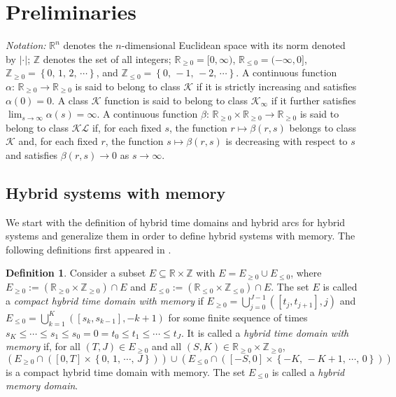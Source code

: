\documentclass[journal,final,twocolumn]{IEEEtran}
\theoremstyle{definition}
\newtheorem{defn}{Definition}
\begin{document}
\section{Preliminaries}\label{sec:pre}

\emph{Notation:} ${\mathbb R}^n$ denotes the $n$-dimensional Euclidean space with its norm denoted by  ${\left\vert{\cdot}\right\vert}$; $\mathbb{Z}$ denotes the set of all integers; ${\mathbb R}_{\ge 0}= [0,\infty)$, ${\mathbb R}_{\le 0}=(-\infty,0]$, ${\mathbb{Z}}_{\ge 0}={\left\{{0,\,1,\,2,\,\cdots}\right\}}$, and ${\mathbb{Z}}_{\le 0}={\left\{{0,\,-1,\,-2,\,\cdots}\right\}}$. A continuous function $\alpha:\,{\mathbb R}_{\ge 0} \rightarrow {\mathbb R}_{\ge 0}$ is said to belong to class $\mathcal{K}$ if it is strictly increasing and satisfies $\alpha(0) = 0$. A class $\mathcal{K}$ function is said to belong to class $\mathcal{K}_{\infty}$ if it further satisfies $\lim_{s \rightarrow \infty} \alpha(s) = \infty$. A continuous function $\beta:\,{\mathbb R}_{\ge 0}\times{\mathbb R}_{\ge 0} \rightarrow {\mathbb R}_{\ge 0}$ is said to belong to class $\mathcal{KL}$ if, for each fixed $s$, the function $r\mapsto\beta(r,s)$ belongs to class $\mathcal{K}$ and, for each fixed $r$, the function $s\mapsto\beta(r,s)$ is decreasing with respect to $s$ and satisfies $\beta(r,s) \rightarrow 0$ as $s \rightarrow \infty$.

\subsection{Hybrid systems with memory}

We start with the definition of hybrid time domains and hybrid arcs
\cite{goebel2012hybrid,goebel2006solutions} for hybrid systems and generalize them in order to define hybrid systems with memory. The following definitions first appeared in \cite{liu2012generalized,liu2014hybrid-ifac}.

\begin{defn}
Consider a subset $E{\subseteq} {\mathbb R}\times {\mathbb{Z}}$ with $E=E_{\ge 0}\cup E_{\le 0}$, where $E_{\ge 0}:=({\mathbb R}_{\ge 0}\times {\mathbb{Z}}_{\ge 0})\cap E$ and $E_{\le 0}:=({\mathbb R}_{\le 0}\times {\mathbb{Z}}_{\le 0})\cap E$. The set $E$ is called a \emph{compact hybrid time domain with memory} if
$
E_{\ge 0}=\bigcup_{j=0}^{J-1}([t_j,t_{j+1}],j)
$
and
$
E_{\le 0}=\bigcup_{k=1}^{K}([s_k,s_{k-1}],-k+1)
$
for some finite sequence of times $s_{K}\le\cdots\le s_1\le s_0=0=t_0\le t_1\le \cdots\le t_J$. It is called a \emph{hybrid time domain with memory} if, for all $(T,J)\in E_{\ge 0}$ and all $(S,K)\in {\mathbb R}_{\ge 0}\times {\mathbb{Z}}_{\ge 0}$,
$
(E_{\ge 0}\cap ([0,T]\times{\left\{{0,\,1,\,\cdots,\,J}\right\}})) \cup (E_{\le 0}\cap ([-S,0]\times{\left\{{-K,\,-K+1,\,\cdots,\,0}\right\}}))
$
is a compact hybrid time domain with memory. The set $E_{\le 0}$ is called a \emph{hybrid memory domain}.
\end{defn}
\end{document}
